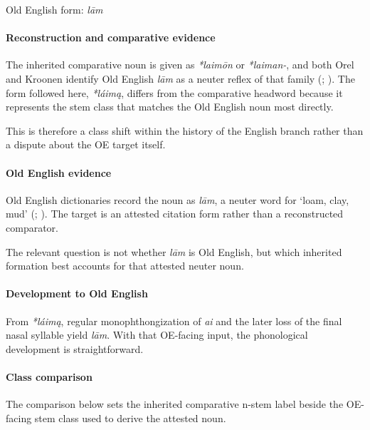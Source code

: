 \documentclass[
  british,
  a4paper,
]{article}
\begin{document}
Old English form: \emph{lām}

\paragraph{Reconstruction and comparative
evidence}\label{reconstruction-and-comparative-evidence-17}

The inherited comparative noun is given as \emph{*laimōn} or
\emph{*laiman-}, and both Orel and Kroonen identify Old English
\emph{lām} as a neuter reflex of that family
(;
). The form followed here,
\emph{*láimą}, differs from the comparative headword because it
represents the stem class that matches the Old English noun most
directly.

This is therefore a class shift within the history of the English branch
rather than a dispute about the OE target itself.

\paragraph{Old English evidence}\label{old-english-evidence-17}

Old English dictionaries record the noun as \emph{lām}, a neuter word
for `loam, clay, mud' (; ).
The target is an attested citation form rather than a reconstructed
comparator.

The relevant question is not whether \emph{lām} is Old English, but
which inherited formation best accounts for that attested neuter noun.

\paragraph{Development to Old
English}\label{development-to-old-english-17}

From \emph{*láimą}, regular monophthongization of \emph{ai} and the
later loss of the final nasal syllable yield \emph{lām}. With that
OE-facing input, the phonological development is straightforward.

\paragraph{Class comparison}\label{class-comparison-3}

The comparison below sets the inherited comparative n-stem label beside
the OE-facing stem class used to derive the attested noun.
\end{document}
